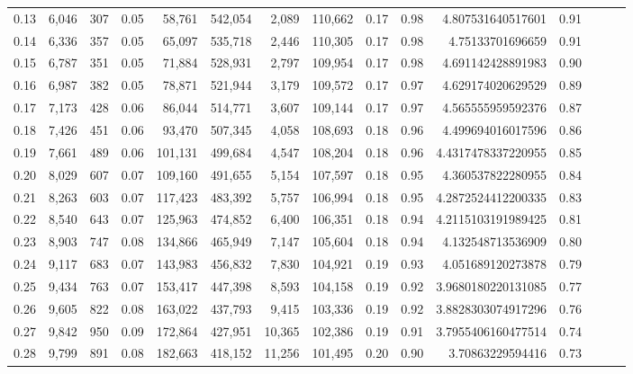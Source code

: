 \begin{tabular}{rrrrrrrrrrrrrrr}
0.13 &   6,046 &    307 &  0.05 &   58,761 &  542,054 &    2,089 &  110,662 &  0.17 &  0.98 &     4.807531640517601 &      0.91 \\
0.14 &   6,336 &    357 &  0.05 &   65,097 &  535,718 &    2,446 &  110,305 &  0.17 &  0.98 &      4.75133701696659 &      0.91 \\
0.15 &   6,787 &    351 &  0.05 &   71,884 &  528,931 &    2,797 &  109,954 &  0.17 &  0.98 &     4.691142428891983 &      0.90 \\
0.16 &   6,987 &    382 &  0.05 &   78,871 &  521,944 &    3,179 &  109,572 &  0.17 &  0.97 &     4.629174020629529 &      0.89 \\
0.17 &   7,173 &    428 &  0.06 &   86,044 &  514,771 &    3,607 &  109,144 &  0.17 &  0.97 &     4.565555959592376 &      0.87 \\
0.18 &   7,426 &    451 &  0.06 &   93,470 &  507,345 &    4,058 &  108,693 &  0.18 &  0.96 &     4.499694016017596 &      0.86 \\
0.19 &   7,661 &    489 &  0.06 &  101,131 &  499,684 &    4,547 &  108,204 &  0.18 &  0.96 &    4.4317478337220955 &      0.85 \\
0.20 &   8,029 &    607 &  0.07 &  109,160 &  491,655 &    5,154 &  107,597 &  0.18 &  0.95 &     4.360537822280955 &      0.84 \\
0.21 &   8,263 &    603 &  0.07 &  117,423 &  483,392 &    5,757 &  106,994 &  0.18 &  0.95 &    4.2872524412200335 &      0.83 \\
0.22 &   8,540 &    643 &  0.07 &  125,963 &  474,852 &    6,400 &  106,351 &  0.18 &  0.94 &    4.2115103191989425 &      0.81 \\
0.23 &   8,903 &    747 &  0.08 &  134,866 &  465,949 &    7,147 &  105,604 &  0.18 &  0.94 &     4.132548713536909 &      0.80 \\
0.24 &   9,117 &    683 &  0.07 &  143,983 &  456,832 &    7,830 &  104,921 &  0.19 &  0.93 &     4.051689120273878 &      0.79 \\
0.25 &   9,434 &    763 &  0.07 &  153,417 &  447,398 &    8,593 &  104,158 &  0.19 &  0.92 &    3.9680180220131085 &      0.77 \\
0.26 &   9,605 &    822 &  0.08 &  163,022 &  437,793 &    9,415 &  103,336 &  0.19 &  0.92 &    3.8828303074917296 &      0.76 \\
0.27 &   9,842 &    950 &  0.09 &  172,864 &  427,951 &   10,365 &  102,386 &  0.19 &  0.91 &    3.7955406160477514 &      0.74 \\
0.28 &   9,799 &    891 &  0.08 &  182,663 &  418,152 &   11,256 &  101,495 &  0.20 &  0.90 &      3.70863229594416 &      0.73 \\

\end{tabular}
